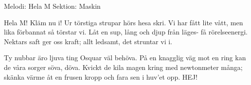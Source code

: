 \begin{song}

\begin{songmeta}
Melodi: Hela M
Sektion: Maskin
\end{songmeta}

\begin{songtext}
Hela M!
Kläm nu i!
Ur törstiga strupar hörs hesa skri.
Vi har fått
lite vått,
men lika förbannat så törstar vi.
Låt en sup,
lång och djup
från läges- få rörelseenergi.
Nektars saft
ger oss kraft;
allt ledsamt, det struntar vi i.

Ty nubbar äro ljuva ting
Osquar väl behöva.
På en knagglig väg mot en ring
kan de våra sorger söva, döva.
Kvickt de kila magen kring
med newtonmeter många;
skänka värme åt en frusen kropp
och fara sen i huv'et opp.
HEJ!
\end{songtext}
\end{song}

